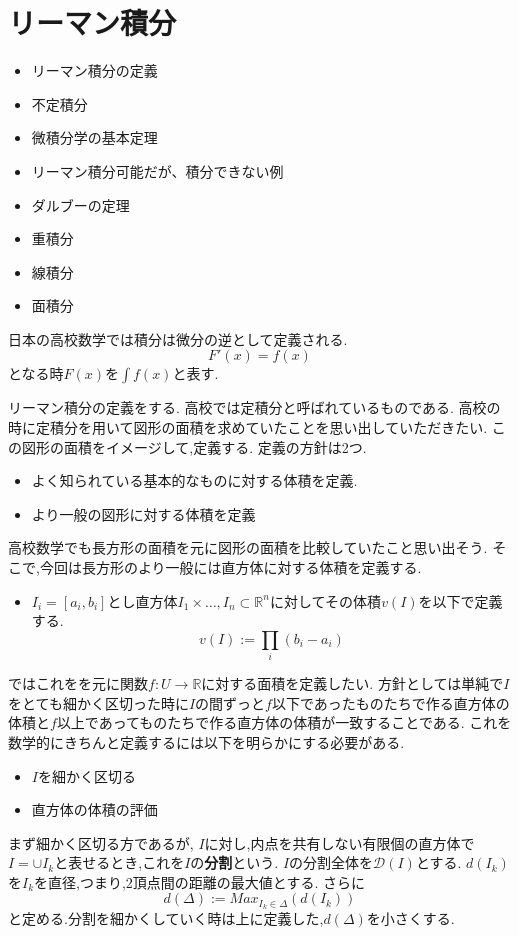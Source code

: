\section{リーマン積分}
\begin{itemize}
\item リーマン積分の定義
\item 不定積分
\item 微積分学の基本定理
\item リーマン積分可能だが、積分できない例
\item ダルブーの定理
\item 重積分
\item 線積分
\item 面積分
\end{itemize}

日本の高校数学では積分は微分の逆として定義される.
\begin{equation*}
 F'(x) = f(x)
\end{equation*}
となる時$F(x)$を$\int f(x)$と表す.

リーマン積分の定義をする.
高校では定積分と呼ばれているものである.
高校の時に定積分を用いて図形の面積を求めていたことを思い出していただきたい.
この図形の面積をイメージして,定義する.
定義の方針は2つ.
\begin{itemize}
  \item よく知られている基本的なものに対する体積を定義.
  \item より一般の図形に対する体積を定義
\end{itemize}

高校数学でも長方形の面積を元に図形の面積を比較していたこと思い出そう.
そこで,今回は長方形のより一般には直方体に対する体積を定義する.
\begin{itemize}
  \item $I_i = [a_i, b_i]$とし直方体$I_1 \times  \ldots, I_n \subset \mathbb{R}^n$に対してその体積$v(I)$を以下で定義する.
  \begin{equation*}
  v(I) := \prod_i (b_i - a_i)
  \end{equation*}
\end{itemize}

ではこれをを元に関数$f:U \to \mathbb{R}$に対する面積を定義したい.
方針としては単純で$I$をとても細かく区切った時に$I$の間ずっと$f$以下であったものたちで作る直方体の体積と$f$以上であってものたちで作る直方体の体積が一致することである.
これを数学的にきちんと定義するには以下を明らかにする必要がある.
\begin{itemize}
  \item $I$を細かく区切る
  \item 直方体の体積の評価
\end{itemize}
まず細かく区切る方であるが,
$I$に対し,内点を共有しない有限個の直方体で$I = \cup I_k$と表せるとき,これを$I$の\textbf{分割}という.
$I$の分割全体を$\mathcal{D}(I)$とする.
$d(I_k)$を$I_k$を直径,つまり,2頂点間の距離の最大値とする.
さらに
\begin{equation*}
d(\Delta):= Max_{I_k \in \Delta}(d(I_k))
\end{equation*}
と定める.分割を細かくしていく時は上に定義した,$d(\Delta)$を小さくする.


